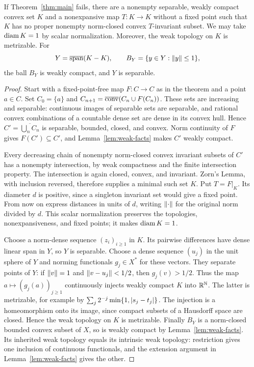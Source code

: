 \begin{samepage}
\begin{lemma}\label{lem:reduction}
If Theorem~\ref{thm:main} fails, there are a nonempty separable,
weakly compact convex set $K$ and a nonexpansive map $T:K\to K$ without
a fixed point such that $K$ has no proper nonempty norm-closed convex
$T$-invariant subset. We may take $\operatorname{diam} K=1$ by scalar normalization.
Moreover, the weak topology on $K$ is metrizable. For
\[
          Y=\overline{\operatorname{span}}(K-K),
          \qquad B_Y=\{y\in Y:\lVert y\rVert\leq1\},
\]
the ball $B_Y$ is weakly compact, and $Y$ is separable.
\end{lemma}
\end{samepage}

\begin{proof}
Start with a fixed-point-free map $F:C\to C$ as in the theorem and a point
$a\in C$. Set $C_0=\{a\}$ and
$C_{n+1}=\overline{\operatorname{conv}}(C_n\cup F(C_n))$.
These sets are increasing and separable: continuous images of separable
sets are separable, and rational convex combinations of a countable dense
set are dense in its convex hull. Hence
$C'=\overline{\bigcup_n C_n}$ is separable, bounded, closed, and convex.
Norm continuity of $F$ gives $F(C')\subseteq C'$, and
Lemma~\ref{lem:weak-facts} makes $C'$ weakly compact.

Every decreasing chain of nonempty norm-closed convex invariant subsets
of $C'$ has a nonempty intersection, by weak compactness and the finite
intersection property. The intersection is again closed, convex, and
invariant. Zorn's Lemma, with inclusion reversed, therefore supplies a
minimal such set $K$. Put $T=F|_K$. Its diameter $d$ is positive, since
a singleton invariant set would give a fixed point. From now on express
distances in units of $d$, writing $\lVert\cdot\rVert$ for the original norm
divided by $d$. This scalar normalization preserves the topologies,
nonexpansiveness, and fixed points; it makes $\operatorname{diam} K=1$.

Choose a norm-dense sequence $(z_i)_{i\geq1}$ in $K$. Its pairwise
differences have dense linear span in $Y$, so $Y$ is separable.
Choose a dense sequence $(u_j)$ in the unit sphere of $Y$ and norming
functionals $g_j\in X^*$ for these vectors. They separate points of $Y$:
if $\lVert v\rVert=1$ and $\lVert v-u_j\rVert<1/2$, then $g_j(v)>1/2$.
Thus the map $a\mapsto(g_j(a))_{j\geq1}$ continuously injects weakly
compact $K$ into $\mathbb R^{\mathbb N}$. The latter is metrizable, for example by
$\sum_j2^{-j}\min\{1,\lvert s_j-t_j\rvert\}$.
The injection is a homeomorphism onto its image, since compact subsets
of a Hausdorff space are closed. Hence the weak topology on $K$ is
metrizable. Finally $B_Y$ is a norm-closed bounded convex subset of $X$,
so is weakly compact by Lemma~\ref{lem:weak-facts}. Its inherited weak
topology equals its intrinsic weak topology: restriction gives one
inclusion of continuous functionals, and the extension argument in
Lemma~\ref{lem:weak-facts} gives the other.
\end{proof}

